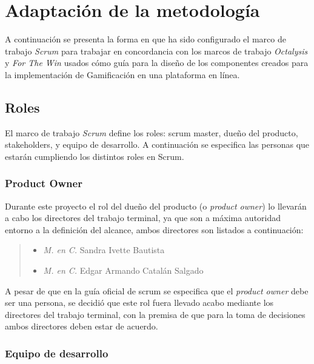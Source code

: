 

\section{Adaptación de la metodología}

 A continuación se presenta la forma en que ha sido configurado el marco de trabajo {\it Scrum}
 para trabajar en concordancia con los marcos de trabajo {\it Octalysis} y {\it For The Win}
 usados cómo guía para la diseño de los componentes creados para la implementación de
 Gamificación en una plataforma en línea.

\subsection{Roles}

 \noindent
 El marco de trabajo {\it Scrum} define los roles: scrum master, dueño del producto, stakeholders,
 y equipo de desarrollo. A continuación se especifica las personas que estarán cumpliendo los
 distintos roles en Scrum.

\subsubsection{Product Owner}

 Durante este proyecto el rol del dueño del producto (o {\it product owner}) lo llevarán a cabo
 los directores del trabajo terminal, ya que son a máxima autoridad entorno a la definición del
 alcance, ambos directores son listados a continuación:

    \begin{quote}
    \begin{itemize}
        \item {\it M. en C.} Sandra Ivette Bautista
        \item {\it M. en C.} Edgar Armando Catalán Salgado
    \end{itemize}
    \end{quote}

 \noindent
 A pesar de que en la guía oficial de scrum \cite{TheScrumGuide} se especifica que el {\it
 product owner} debe ser una persona, se decidió que este rol fuera llevado acabo mediante los
 directores del trabajo terminal, con la premisa de que para la toma de decisiones ambos
 directores deben estar de acuerdo.

\subsubsection{Equipo de desarrollo}

